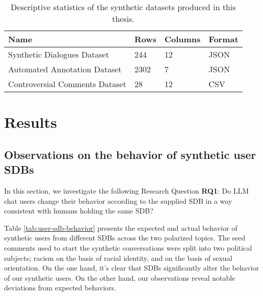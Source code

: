 \begin{table}
	\begin{tabular}
		{ |p{6cm}|p{1cm}|p{1.5cm}|p{2cm}|}
		\hline
		\cellcolor{blue!25}\textbf{Name} & \cellcolor{blue!25}\textbf{Rows} & \cellcolor{blue!25}\textbf{Columns} & \cellcolor{blue!25}\textbf{Format}\\
		\hline
		Synthetic Dialogues Dataset & 244 & 12 & JSON\\
		\hline
		Automated Annotation Dataset & 2302 & 7 & JSON\\
		\hline
		Controversial Comments Dataset & 28 & 12 & CSV\\
		\hline
	\end{tabular}
	\caption{Descriptive statistics of the synthetic datasets produced in this thesis.}
	\label{tab:datasets}
\end{table}


\section{Results}
\label{sec:evaluation:analysis}

\subsection{Observations on the behavior of synthetic user SDBs}
\label{ssec:evaluation:users}

In this section, we investigate the following Research Question \textbf{RQ1}: Do LLM chat users change their behavior according to the supplied \ac{SDB} in a way consistent with humans holding the same \ac{SDB}?

Table \ref{tab:user-sdb-behavior} presents the expected and actual behavior of synthetic users from different \acp{SDB} across the two polarized topics. The seed comments used to start the synthetic conversations were split into two political subjects; racism on the basis of racial identity, and on the basis of sexual orientation. On the one hand, it's clear that \acp{SDB} significantly alter the behavior of our synthetic users. On the other hand, our observations reveal notable deviations from expected behaviors.

